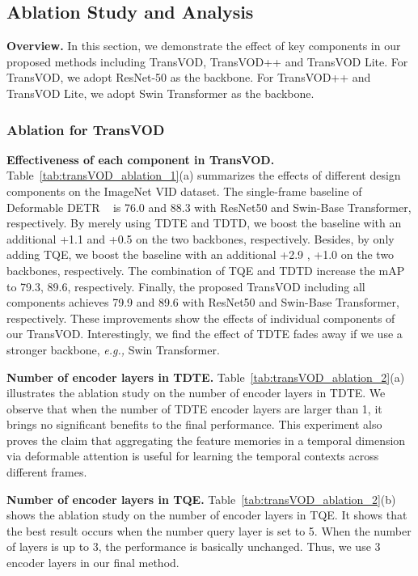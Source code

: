 \documentclass[10pt,journal,compsoc]{IEEEtran}
\begin{document}
\subsection{Ablation Study and Analysis}

\noindent
\textbf{Overview.} In this section, we demonstrate the effect of key components in our proposed methods including TransVOD, TransVOD++ and TransVOD Lite. For TransVOD, we adopt ResNet-50 as the backbone. For TransVOD++ and TransVOD Lite, we adopt Swin Transformer as the backbone. 



\subsubsection{Ablation for TransVOD}

\noindent 
\textbf{Effectiveness of each component in TransVOD.}
Table~\ref{tab:transVOD_ablation_1}(a) summarizes the effects of different design components on the ImageNet VID dataset. 
The single-frame baseline of Deformable DETR ~\cite{zhu2020deformable} is 76.0 and 88.3 with ResNet50 and Swin-Base Transformer, respectively. By merely using TDTE and TDTD, we boost the baseline with an additional +1.1 and +0.5 on the two backbones, respectively. Besides, by only adding TQE, we boost the baseline with an additional +2.9 , +1.0  on the two backbones, respectively. The combination of TQE and TDTD increase the mAP to 79.3, 89.6, respectively. Finally, the proposed TransVOD including all components achieves 79.9 and 89.6 with ResNet50 and Swin-Base Transformer, respectively. These improvements show the effects of individual components of our TransVOD. Interestingly, we find the effect of TDTE fades away if we use a stronger backbone, \emph{e.g.,} Swin Transformer. 


\noindent \textbf{Number of encoder layers in TDTE.}
Table~\ref{tab:transVOD_ablation_2}(a) illustrates the ablation study on the number of encoder layers in TDTE. We observe that when the number of TDTE encoder layers are larger than 1, it brings no significant benefits to the final performance. This experiment also proves the claim that aggregating the feature memories in a temporal dimension via deformable attention is useful for learning the temporal contexts across different frames.

\noindent 
\textbf{Number of encoder layers in TQE.}
Table~\ref{tab:transVOD_ablation_2}(b) shows the ablation study on the number of encoder layers in TQE. It shows that the best result occurs when the number query layer is set to 5. When the number of layers is up to 3, the performance is basically unchanged. Thus, we use 3 encoder layers in our final method.
\end{document}
